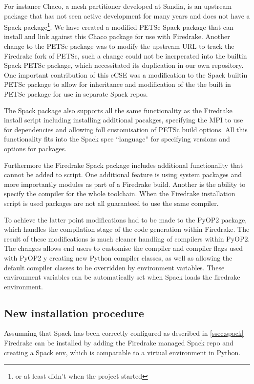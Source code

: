\documentclass[a4paper,11pt]{article}
\begin{document}
For instance Chaco, a mesh partitioner developed at Sandia, is an upstream package that has not seen active development for many years and does not have a Spack package\footnote{or at least didn't when the project started}.
We have created a modified PETSc Spack package that can install and link against this Chaco package for use with Firedrake.
Another change to the PETSc package was to modify the upstream URL to track the Firedrake fork of PETSc, such a change could not be incrperated into the builtin Spack PETSc package, which necessitated its duplication in our own repository.
One important contribution of this eCSE was a modification to the Spack builtin PETSc package to allow for inheritance and modification of the the built in PETSc package for use in separate Spack repos.

The Spack package also supports all the same functionality as the Firedrake install script including installing additional pacakges, specifying the MPI to use for dependencies and allowing foll customisation of PETSc build options.
All this functionality fits into the Spack spec ``language'' for specifying versions and options for packages.

Furthermore the Firedrake Spack package includes additional functionality that cannot be added to script.
One additional feature is using system packages and more importantly modules as part of a Firedrake build.
Another is the ability to specify the compiler for the whole toolchain.
When the Firedrake installation script is used packages are not all guaranteed to use the same compiler.

To achieve the latter point modifications had to be made to the PyOP2 package, which handles the compilation stage of the code generation within Firedrake.
The result of these modifications is much cleaner handling of compilers within PyOP2.
The changes allows end users to customise the compiler and compiler flags used with PyOP2 y creating new Python compiler classes, as well as allowing the default compiler classes to be overridden by environment variables.
These environment variables can be automatically set when Spack loads the firedrake environment.


\subsection{New installation procedure}
\label{ssec:new}
Assumning that Spack has been correctly configured as described in \cref{ssec:spack} Firedrake can be installed by adding the Firedrake managed Spack repo and creating a Spack env, which is comparable to a virtual environment in Python.
\end{document}
